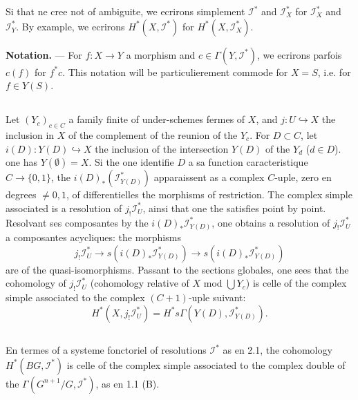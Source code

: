 \documentclass[11pt,a4paper]{article}
\theoremstyle{plain}
\theoremstyle{definition}
\begin{document}
Si that ne cree not of ambiguite, we ecrirons simplement $\mathscr{I}^*$ and $\mathscr{I}_X^*$ for $\mathscr{I}_X^*$ and $\mathscr{I}_Y^*$. By example, we ecrirons $H^*(X, \mathscr{I}^*)$ for $H^*(X, \mathscr{I}_X^*)$.

\textbf{Notation.} --- For $f : X \to Y$ a morphism and $c \in \Gamma(Y, \mathscr{I}^*)$, we ecrirons parfois $c(f)$ for $f^* c$. This notation will be particulierement commode for $X = S$, i.e. for $f \in Y(S)$.

\subsection{}\label{2.2}

Let $(Y_c)_{c \in C}$ a family finite of under-schemes fermes of $X$, and $j : U \hookrightarrow X$ the inclusion in $X$ of the complement of the reunion of the $Y_c$. For $D \subset C$, let $i(D) : Y(D) \hookrightarrow X$ the inclusion of the intersection $Y(D)$ of the $Y_d$ ($d \in D$). one has $Y(\emptyset) = X$. Si the one identifie $D$ a sa function caracteristique $C \to \{0, 1\}$, the $i(D)_* (\mathscr{I}_{Y(D)}^*)$ apparaissent as a complex $C$-uple, zero en degrees $\neq 0, 1$, of differentielles the morphisms of restriction. The complex simple associated is a resolution of $j_! \mathscr{I}_U^*$, ainsi that one the satisfies point by point. Resolvant ses composantes by the $i(D)_* \mathscr{I}_{Y(D)}^*$, one obtains a resolution of $j_! \mathscr{I}_U^*$ a composantes acycliques: the morphisms
\begin{equation}\label{2.2.1}
j_! \mathscr{I}_U^* \to s(i(D)_* \mathscr{I}_{Y(D)}^*) \to s(i(D)_* \mathscr{I}_{Y(D)}^*)
\end{equation}
are of the quasi-isomorphisms. Passant to the sections globales, one sees that the cohomology of $j_! \mathscr{I}_U^*$ (cohomology relative of $X$ mod $\bigcup Y_c$) is celle of the complex simple associated to the complex $(C+1)$-uple suivant:
\begin{equation}\label{2.2.2}
H^*(X, j_! \mathscr{I}_U^*) = H^* s\Gamma(Y(D), \mathscr{I}_{Y(D)}^*).
\end{equation}

\subsection{}\label{2.3}

En termes of a systeme fonctoriel of resolutions $\mathscr{I}^*$ as en 2.1, the cohomology $H^*(BG, \mathscr{I}^*)$ is celle of the complex simple associated to the complex double of the $\Gamma(G^{n+1}/G, \mathscr{I}^*)$, as en 1.1 (B).
\end{document}
